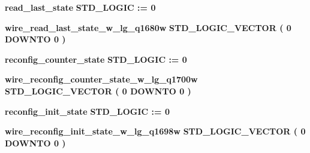 \begin{DoxyCompactItemize}
\item 
{\bf read\+\_\+last\+\_\+state} {\bfseries \textcolor{comment}{S\+T\+D\+\_\+\+L\+O\+G\+IC}\textcolor{vhdlchar}{ }\textcolor{vhdlchar}{ }\textcolor{vhdlchar}{\+:}\textcolor{vhdlchar}{=}\textcolor{vhdlchar}{ }\textcolor{vhdlchar}{ }\textcolor{vhdlchar}{\textquotesingle{}}\textcolor{vhdlchar}{ } \textcolor{vhdldigit}{0} \textcolor{vhdlchar}{ }\textcolor{vhdlchar}{\textquotesingle{}}\textcolor{vhdlchar}{ }} 
\item 
{\bf wire\+\_\+read\+\_\+last\+\_\+state\+\_\+w\+\_\+lg\+\_\+q1680w} {\bfseries \textcolor{comment}{S\+T\+D\+\_\+\+L\+O\+G\+I\+C\+\_\+\+V\+E\+C\+T\+OR}\textcolor{vhdlchar}{ }\textcolor{vhdlchar}{(}\textcolor{vhdlchar}{ }\textcolor{vhdlchar}{ } \textcolor{vhdldigit}{0} \textcolor{vhdlchar}{ }\textcolor{keywordflow}{D\+O\+W\+N\+TO}\textcolor{vhdlchar}{ }\textcolor{vhdlchar}{ } \textcolor{vhdldigit}{0} \textcolor{vhdlchar}{ }\textcolor{vhdlchar}{)}\textcolor{vhdlchar}{ }} 
\item 
{\bf reconfig\+\_\+counter\+\_\+state} {\bfseries \textcolor{comment}{S\+T\+D\+\_\+\+L\+O\+G\+IC}\textcolor{vhdlchar}{ }\textcolor{vhdlchar}{ }\textcolor{vhdlchar}{\+:}\textcolor{vhdlchar}{=}\textcolor{vhdlchar}{ }\textcolor{vhdlchar}{ }\textcolor{vhdlchar}{\textquotesingle{}}\textcolor{vhdlchar}{ } \textcolor{vhdldigit}{0} \textcolor{vhdlchar}{ }\textcolor{vhdlchar}{\textquotesingle{}}\textcolor{vhdlchar}{ }} 
\item 
{\bf wire\+\_\+reconfig\+\_\+counter\+\_\+state\+\_\+w\+\_\+lg\+\_\+q1700w} {\bfseries \textcolor{comment}{S\+T\+D\+\_\+\+L\+O\+G\+I\+C\+\_\+\+V\+E\+C\+T\+OR}\textcolor{vhdlchar}{ }\textcolor{vhdlchar}{(}\textcolor{vhdlchar}{ }\textcolor{vhdlchar}{ } \textcolor{vhdldigit}{0} \textcolor{vhdlchar}{ }\textcolor{keywordflow}{D\+O\+W\+N\+TO}\textcolor{vhdlchar}{ }\textcolor{vhdlchar}{ } \textcolor{vhdldigit}{0} \textcolor{vhdlchar}{ }\textcolor{vhdlchar}{)}\textcolor{vhdlchar}{ }} 
\item 
{\bf reconfig\+\_\+init\+\_\+state} {\bfseries \textcolor{comment}{S\+T\+D\+\_\+\+L\+O\+G\+IC}\textcolor{vhdlchar}{ }\textcolor{vhdlchar}{ }\textcolor{vhdlchar}{\+:}\textcolor{vhdlchar}{=}\textcolor{vhdlchar}{ }\textcolor{vhdlchar}{ }\textcolor{vhdlchar}{\textquotesingle{}}\textcolor{vhdlchar}{ } \textcolor{vhdldigit}{0} \textcolor{vhdlchar}{ }\textcolor{vhdlchar}{\textquotesingle{}}\textcolor{vhdlchar}{ }} 
\item 
{\bf wire\+\_\+reconfig\+\_\+init\+\_\+state\+\_\+w\+\_\+lg\+\_\+q1698w} {\bfseries \textcolor{comment}{S\+T\+D\+\_\+\+L\+O\+G\+I\+C\+\_\+\+V\+E\+C\+T\+OR}\textcolor{vhdlchar}{ }\textcolor{vhdlchar}{(}\textcolor{vhdlchar}{ }\textcolor{vhdlchar}{ } \textcolor{vhdldigit}{0} \textcolor{vhdlchar}{ }\textcolor{keywordflow}{D\+O\+W\+N\+TO}\textcolor{vhdlchar}{ }\textcolor{vhdlchar}{ } \textcolor{vhdldigit}{0} \textcolor{vhdlchar}{ }\textcolor{vhdlchar}{)}\textcolor{vhdlchar}{ }} 

\end{DoxyCompactItemize}

